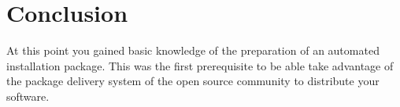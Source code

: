 





\section{Conclusion}

At this point you gained basic knowledge of the preparation of an automated installation package. 
This was the first prerequisite to be able take advantage of the package delivery system of the open source community
to distribute your software. 
